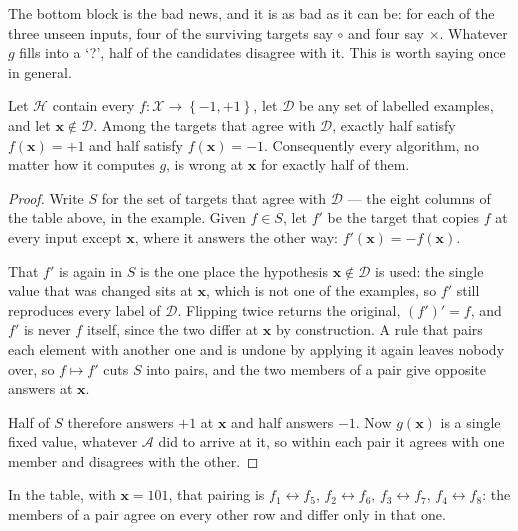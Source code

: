 The bottom block is the bad news, and it is as bad as it can be: for each of the
three unseen inputs, four of the surviving targets say \(\circ\) and four say
\(\times\). Whatever \(g\) fills into a `?', half of the candidates disagree
with it. This is worth saying once in general.

\begin{proposition}\label{prop:nfl}
    Let \(\mathcal{H}\) contain every \(f\colon \mathcal{X} \to
    \left\{ -1, +1 \right\}\), let \(\mathcal{D}\) be any set of labelled
    examples, and let \(\bm{x} \notin \mathcal{D}\). Among the targets that
    agree with \(\mathcal{D}\), exactly half satisfy \(f(\bm{x}) = +1\) and half
    satisfy \(f(\bm{x}) = -1\). Consequently every algorithm, no matter how it
    computes \(g\), is wrong at \(\bm{x}\) for exactly half of them.
\end{proposition}

\begin{proof}
    Write \(S\) for the set of targets that agree with \(\mathcal{D}\) --- the
    eight columns of the table above, in the example. Given \(f \in S\), let
    \(f'\) be the target that copies \(f\) at every input except \(\bm{x}\),
    where it answers the other way: \(f'(\bm{x}) = -f(\bm{x})\).

    That \(f'\) is again in \(S\) is the one place the hypothesis
    \(\bm{x} \notin \mathcal{D}\) is used: the single value that was changed
    sits at \(\bm{x}\), which is not one of the examples, so \(f'\) still
    reproduces every label of \(\mathcal{D}\). Flipping twice returns the
    original, \((f')' = f\), and \(f'\) is never \(f\) itself, since the two
    differ at \(\bm{x}\) by construction. A rule that pairs each element with
    another one and is undone by applying it again leaves nobody over, so
    \(f \mapsto f'\) cuts \(S\) into pairs, and the two members of a pair give
    opposite answers at \(\bm{x}\).

    Half of \(S\) therefore answers \(+1\) at \(\bm{x}\) and half answers
    \(-1\). Now \(g(\bm{x})\) is a single fixed value, whatever \(\mathcal{A}\)
    did to arrive at it, so within each pair it agrees with one member and
    disagrees with the other.
\end{proof}

In the table, with \(\bm{x} = 101\), that pairing is
\(f_1 \leftrightarrow f_5\), \(f_2 \leftrightarrow f_6\),
\(f_3 \leftrightarrow f_7\), \(f_4 \leftrightarrow f_8\): the members of a pair
agree on every other row and differ only in that one.


